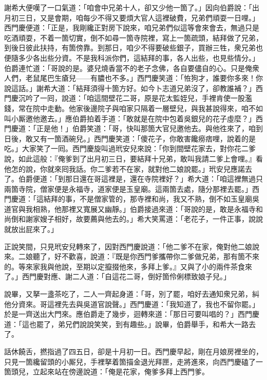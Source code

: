 謝希大便嘆了一口氣道：「咱會中兄弟十人，卻又少他一箇了。」因向伯爵說：「出月初三日，又是會期，咱每少不得又要煩大官人這裡破費，兄弟們頑耍一日哩。」西門慶便道：「正是，我剛纔正對房下說來，咱兄弟們似這等會來會去，無過只是吃酒頑耍，不着一箇切實，倒不如尋一箇寺院裡，寫上一箇疏頭，結拜做了兄弟，到後日彼此扶持，有箇傍靠。到那日，咱少不得要破些銀子，買辦三牲，衆兄弟也便隨多少各出些分資。不是我科派你們，這結拜的事，各人出些，也見些情分。」伯爵連忙道：「哥說的是。婆兒燒香當不的老子念佛，各自要儘自的心。只是俺衆人們，老鼠尾巴生瘡兒——有膿也不多。」西門慶笑道：「恠狗才，誰要你多來！你說這話。」謝希大道：「結拜須得十箇方好。如今卜志道兄弟沒了，卻教誰補？」西門慶沉吟了一囘，說道：「咱這間壁花二哥，原是花太監姪兒，手裡肯使一股濫錢，常在院中走動。他家後邊院子與咱家只隔着一層壁兒，{}與我甚說得來，咱不如叫小厮邀他邀去。」應伯爵拍着手道：「敢就是在院中包着吳銀兒的花子虛麼？」西門慶道：「正是他！」伯爵笑道：「哥，快叫那箇大官兒邀他去。{}與他徃來了，咱到日後，敢又有一箇酒碗兒。」西門慶笑道：「傻花子，你敢害饞癆痞哩，說着的是吃。」大家笑了一囘。西門慶旋叫過玳安兒來說：「你到間壁花家去，對你花二爹說，如此這般：『俺爹到了出月初三日，要結拜十兄弟，敢叫我請二爹上會哩。』看他怎的說，你就來囘我話。你二爹若不在家，就對他二娘說罷。」玳安兒應諾去了。伯爵便道：「到那日還在哥這裡是，還在寺院裡好？」希大道：「咱這裡無過只兩箇寺院，僧家便是永福寺，道家便是玉皇廟。{}這兩箇去處，隨分那裡去罷。」西門慶道：「這結拜的事，不是僧家管的，那寺裡和尚，我又不熟，倒不如玉皇廟吳道官與我相熟，他那裡又寬展又幽靜。」伯爵接過來道：「哥說的是，敢是永福寺和尚倒和謝家嫂子相好，故要薦與他去的。」希大笑罵道：「老花子，一件正事，說說就放出屁來了。」

正說笑間，只見玳安兒轉來了，因對西門慶說道：「他二爹不在家，俺對他二娘說來。二娘聽了，好不歡喜，{}說道：『既是你西門爹攜帶你二爹做兄弟，那有箇不來的。{}等來家我與他說，至期以定攛掇他來，多拜上爹。』又與了小的兩件茶食來了。」{}西門慶對應、謝二人道：「自這花二哥，倒好箇伶俐標致娘子兒。」{}

說畢，又拏一盞茶吃了，二人一齊起身道：「哥，別了罷，咱好去通知衆兄弟，糾他分資來。哥這裡先去與吳道官說聲。」西門慶道：「我知道了，我也不留你罷。」於是一齊送出大門來。應伯爵走了幾步，迴轉來道：「那日可要叫唱的？」西門慶道：「這也罷了，弟兄們說說笑笑，到有趣些。」說畢，伯爵舉手，和希大一路去了。

話休饒舌，撚指過了四五日，卻是十月初一日。西門慶早起，剛在月娘房裡坐的，只見一箇纔留頭的小厮兒，手裡拏着箇描金退光拜匣，走將進來，向西門慶磕了一箇頭兒，立起來站在傍邊說道：「俺是花家，俺爹多拜上西門爹。

